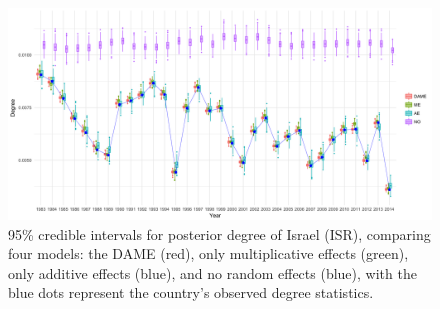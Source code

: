 \documentclass[a4paper]{article}
\begin{document}
\begin{figure}[H]
	\begin{center}
		\includegraphics[width=1\textwidth]{plots_paper/ISR79.png}	
	\end{center}
	\caption {95\% credible intervals for posterior degree of Israel (ISR), comparing four models: the DAME (red), only multiplicative effects (green), only additive effects (blue), and no random effects (blue), with the blue dots represent the country's observed degree statistics.}
	\label{figure:modelvalidation}
\end{figure}
\end{document}
